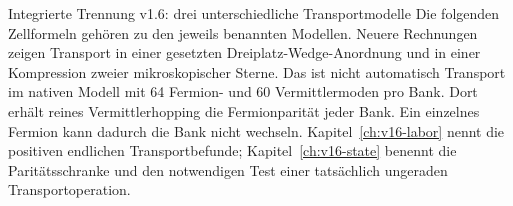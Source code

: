 \begin{grenze}{Integrierte Trennung v1.6: drei unterschiedliche Transportmodelle}
Die folgenden Zellformeln gehören zu den jeweils benannten Modellen. Neuere Rechnungen zeigen Transport in einer gesetzten Dreiplatz-Wedge-Anordnung und in einer Kompression zweier mikroskopischer Sterne. Das ist nicht automatisch Transport im nativen Modell mit 64 Fermion- und 60 Vermittlermoden pro Bank. Dort erhält reines Vermittlerhopping die Fermionparität jeder Bank. Ein einzelnes Fermion kann dadurch die Bank nicht wechseln. Kapitel~\ref{ch:v16-labor} nennt die positiven endlichen Transportbefunde; Kapitel~\ref{ch:v16-state} benennt die Paritätsschranke und den notwendigen Test einer tatsächlich ungeraden Transportoperation.
\end{grenze}
